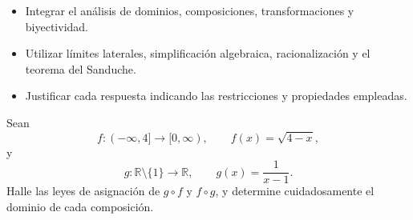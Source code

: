 \documentclass[10pt,a5paper]{article}
\newif\ifmostrarSoluciones
\newenvironment{solucionejercicio}[1]{%
  \par\medskip\noindent\textbf{Solución del ejercicio #1.}%
  \enspace\ignorespaces
}{%
  \par\medskip
}
\begin{document}

\begin{objetivos}
\begin{itemize}
  \item Integrar el análisis de dominios, composiciones, transformaciones y biyectividad.
  \item Utilizar límites laterales, simplificación algebraica, racionalización y el teorema del Sanduche.
  \item Justificar cada respuesta indicando las restricciones y propiedades empleadas.
\end{itemize}
\end{objetivos}

\begin{ejerciciopractica}
  Sean
  \[
    f\colon(-\infty,4]\longrightarrow[0,\infty),
    \qquad
    f(x)=\sqrt{4-x},
  \]
  y
  \[
    g\colon\mathbb{R}\setminus\{1\}\longrightarrow\mathbb{R},
    \qquad
    g(x)=\frac{1}{x-1}.
  \]
  Halle las leyes de asignación de $g\circ f$ y $f\circ g$, y determine cuidadosamente el dominio de cada composición.
\end{ejerciciopractica}

\ifmostrarSoluciones
\begin{solucionejercicio}{1}
  Recordemos que un punto $x$ pertenece al dominio de $g\circ f$ si se
  cumplen simultáneamente las dos condiciones
  \[
    x\in D_f
    \qquad\text{y}\qquad
    f(x)\in D_g.
  \]
  Al sustituir la ley de $f$ en la ley de $g$, obtenemos
  \[
    (g\circ f)(x)
    =g\bigl(f(x)\bigr)
    =\frac{1}{\sqrt{4-x}-1}.
  \]
  La primera condición exige
  \[
    x\leq4.
  \]
  Como el dominio de $g$ excluye al número $1$, la segunda condición exige
  \[
    f(x)\neq1.
  \]
  Para determinar qué punto debe excluirse, resolvemos
  \[
    \sqrt{4-x}=1
    \iff 4-x=1
    \iff x=3.
  \]
  Por tanto,
  \[
    D_{g\circ f}=(-\infty,4]\setminus\{3\}.
  \]

  Para estudiar $f\circ g$, usamos ahora las condiciones
  \[
    x\in D_g
    \qquad\text{y}\qquad
    g(x)\in D_f.
  \]
  Su ley de asignación es
  \[
    (f\circ g)(x)
    =f\bigl(g(x)\bigr)
    =\sqrt{4-\frac{1}{x-1}}.
  \]
  La primera condición exige $x\neq1$. La segunda exige que la entrada de la
  raíz sea no negativa:
  \[
    4-\frac{1}{x-1}
    =\frac{4x-5}{x-1}
    \geq0.
  \]
  Los puntos que separan los intervalos del análisis de signos son
  \[
    x=1
    \qquad\text{y}\qquad
    x=\frac54.
  \]
  El cociente es positivo en $(-\infty,1)$, negativo en
  $(1,5/4)$ y no negativo en $[5/4,\infty)$. El punto $x=1$ no se incluye
  porque anula el denominador; el punto $x=5/4$ sí se incluye porque produce
  un radicando igual a cero. Concluimos que
  \[
    D_{f\circ g}
    =(-\infty,1)\cup\left[\frac54,\infty\right).
  \]
\end{solucionejercicio}
\fi
\end{document}
